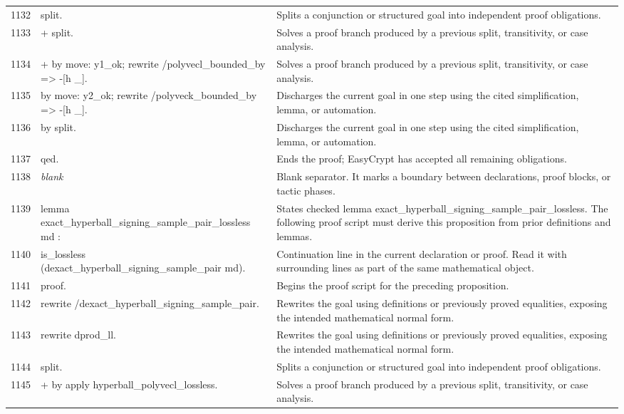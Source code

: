 \documentclass[10pt]{article}
\begin{document}
\begin{longtable}{r L{0.53\textwidth} L{0.37\textwidth}}
1132 & {\ttfamily\scriptsize split.} & Splits a conjunction or structured goal into independent proof obligations. \\
1133 & {\ttfamily\scriptsize + split.} & Solves a proof branch produced by a previous split, transitivity, or case analysis. \\
1134 & {\ttfamily\scriptsize   + by move: y1\_ok; rewrite /polyvecl\_bounded\_by => -[h \_].} & Solves a proof branch produced by a previous split, transitivity, or case analysis. \\
1135 & {\ttfamily\scriptsize   by move: y2\_ok; rewrite /polyveck\_bounded\_by => -[h \_].} & Discharges the current goal in one step using the cited simplification, lemma, or automation. \\
1136 & {\ttfamily\scriptsize by split.} & Discharges the current goal in one step using the cited simplification, lemma, or automation. \\
1137 & {\ttfamily\scriptsize qed.} & Ends the proof; EasyCrypt has accepted all remaining obligations. \\
1138 & {\ttfamily\scriptsize \emph{blank}} & Blank separator.  It marks a boundary between declarations, proof blocks, or tactic phases. \\
1139 & {\ttfamily\scriptsize lemma exact\_hyperball\_signing\_sample\_pair\_lossless md :} & States checked lemma exact\_hyperball\_signing\_sample\_pair\_lossless.  The following proof script must derive this proposition from prior definitions and lemmas. \\
1140 & {\ttfamily\scriptsize   is\_lossless (dexact\_hyperball\_signing\_sample\_pair md).} & Continuation line in the current declaration or proof.  Read it with surrounding lines as part of the same mathematical object. \\
1141 & {\ttfamily\scriptsize proof.} & Begins the proof script for the preceding proposition. \\
1142 & {\ttfamily\scriptsize rewrite /dexact\_hyperball\_signing\_sample\_pair.} & Rewrites the goal using definitions or previously proved equalities, exposing the intended mathematical normal form. \\
1143 & {\ttfamily\scriptsize rewrite dprod\_ll.} & Rewrites the goal using definitions or previously proved equalities, exposing the intended mathematical normal form. \\
1144 & {\ttfamily\scriptsize split.} & Splits a conjunction or structured goal into independent proof obligations. \\
1145 & {\ttfamily\scriptsize + by apply hyperball\_polyvecl\_lossless.} & Solves a proof branch produced by a previous split, transitivity, or case analysis. \\

\end{longtable}
\end{document}
